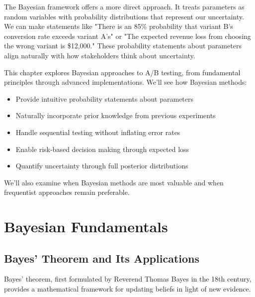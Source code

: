 The Bayesian framework offers a more direct approach. It treats parameters as random variables with probability distributions that represent our uncertainty. We can make statements like "There is an 85\% probability that variant B's conversion rate exceeds variant A's" or "The expected revenue loss from choosing the wrong variant is \$12,000." These probability statements about parameters align naturally with how stakeholders think about uncertainty.

This chapter explores Bayesian approaches to A/B testing, from fundamental principles through advanced implementations. We'll see how Bayesian methods:

\begin{itemize}
    \item Provide intuitive probability statements about parameters
    \item Naturally incorporate prior knowledge from previous experiments
    \item Handle sequential testing without inflating error rates
    \item Enable risk-based decision making through expected loss
    \item Quantify uncertainty through full posterior distributions
\end{itemize}

We'll also examine when Bayesian methods are most valuable and when frequentist approaches remain preferable.

\section{Bayesian Fundamentals}

\subsection{Bayes' Theorem and Its Applications}

Bayes' theorem, first formulated by Reverend Thomas Bayes in the 18th century, provides a mathematical framework for updating beliefs in light of new evidence.

